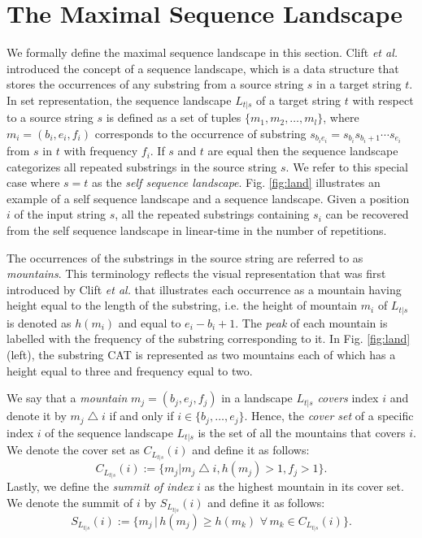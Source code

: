 

\section{The Maximal  Sequence Landscape} \label{sec:landscape}

We formally define the maximal sequence landscape in this section.  Clift \emph{et al.} \cite{mcconnell86} introduced the concept of a sequence landscape, which is a data structure that stores the occurrences of any substring from a source string $s$ in a target string $t$.  In set representation, the sequence landscape $L_{t|s}$ of a target string $t$ with respect to a source string $s$ is defined as a set of tuples $\{m_1, m_2, \ldots, m_l\}$, where $m_i = (b_i, e_i, f_i)$ corresponds to the occurrence of substring $s_{b_ie_i}=s_{b_i}s_{b_i+1}\cdots s_{e_i}$ from $s$ in  $t$ with frequency $f_i$. If $s$ and $t$ are equal then the sequence landscape categorizes all repeated substrings in the source string $s$.  We refer to this special case where $s = t$ as the {\em self sequence landscape}.  Fig. \ref{fig:land} illustrates an example of a self sequence landscape and a sequence landscape.  Given a position $i$ of the input string $s$, all the repeated substrings containing $s_i$ can be recovered from the self sequence landscape in linear-time in the number of repetitions.  %

The occurrences of the substrings in the source string are referred to as {\em mountains}.  This terminology reflects the visual representation that was first introduced by Clift \emph{et al.} \cite{mcconnell86} that illustrates each occurrence as a mountain having height equal to the length of the substring, i.e. the height of mountain $m_i$ of $L_{t|s}$ is denoted as $h(m_i)$ and equal to $e_i - b_i + 1$. The {\em peak} of each mountain is labelled with the frequency of the substring corresponding to it.  In Fig. \ref{fig:land} (left), the substring CAT is represented as two mountains each of which has a height equal to three and frequency equal to two. 



We say that a \emph{mountain} $m_j = (b_j, e_j, f_j)$ in a landscape $L_{t|s}$ \emph{covers} index $i$ and denote it by $m_j \bigtriangleup i$ if and only if $i \in \{b_j, \ldots, e_j\}$. Hence, the \emph{cover set} of a specific index $i$ of the sequence landscape $L_{t|s}$ is the set of all the mountains that covers $i$.  We denote the cover set as $C_{L_{t|s}}(i)$ and define it as follows:
\begin{equation}
C_{L_{t|s}}(i) := \{m_j|m_j \bigtriangleup i,h(m_j)>1,f_j>1\}.
\end{equation}
Lastly, we define the \emph{summit of index} $i$ as the highest mountain in its cover set.   We denote the summit of $i$ by $S_{L_{t|s}}(i)$ and define it as follows: 
\begin{equation}
S_{L_{t|s}}(i) :=  \{ m_j \, | \,h(m_j) \geq h(m_k) \,\, \forall \, m_k \in C_{L_{t|s}}(i)\}.
\end{equation}



